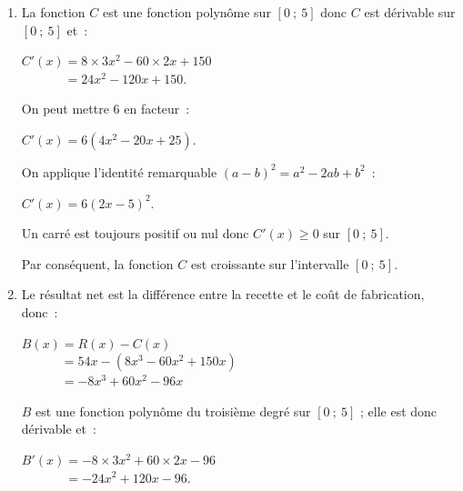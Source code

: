 \begin{corrige}
     \par
     \begin{enumerate}
          \item La fonction $C$ est une fonction polynôme sur $[0~;~5]$ donc $C$ est dérivable sur $[0~;~5]$ et~:
          \par
          $C'(x)= 8 \times 3x^2 - 60 \times 2x + 150$\\
          $\phantom{C'(x)}= 24x^2 - 120x + 150.$
          \par
          On peut mettre $6$ en facteur~:
          \par
          $C'(x)= 6(4x^2-20x+25)$.
          \par
          On applique l'identité remarquable $(a-b)^2=a^2-2ab+b^2$~:
          \par
          $C'(x)= 6(2x-5)^2$.
          \par
          Un carré est toujours positif ou nul donc $C'(x) \geqslant 0$ sur $[0~;~5]$.
          \par
          Par conséquent, la fonction $C$ est croissante sur l'intervalle $[0~;~5]$.
          \par
          \par
          \item
          Le résultat net est la différence entre la recette et le coût de fabrication, donc~:
          \par
          $B(x)=R(x)-C(x)$\\
          $\phantom{B(x)}=54x-(8x^3-60x^2+150x)$\\
          $\phantom{B(x)}=-8x^3+60x^2-96x$
          \par
          $B$ est une fonction polynôme du troisième degré sur $[0~;~5]$ ; elle est donc dérivable et~:
          \par
          $B'(x)=-8\times 3x^2+60\times 2x-96$\\
          $\phantom{B'(x)}=-24x^2+120x-96$.
          \par

\end{enumerate}
\end{corrige}
